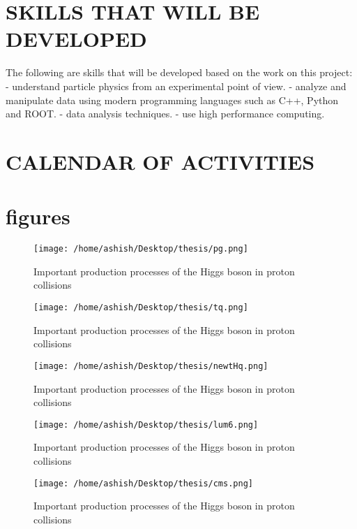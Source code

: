 \documentclass{article}
\begin{document}
\appendix
\section{SKILLS THAT WILL BE DEVELOPED}
\onehalfspacing The following are skills that will be developed based on the work on this project:
- understand particle physics from an experimental point of view.
- analyze and manipulate data using modern programming languages such as C++, Python and 
ROOT.
- data analysis techniques.
- use high performance computing.

\section{CALENDAR OF ACTIVITIES}







\section{figures}

\begin{figure}
  \centering
   \texttt{[image: /home/ashish/Desktop/thesis/pg.png]}
  \caption{Important production processes of the Higgs boson in proton collisions}
   \label{figure 1}
\end{figure}

\begin{figure}
  \centering
   \texttt{[image: /home/ashish/Desktop/thesis/tq.png]}
  \caption{Important production processes of the Higgs boson in proton collisions}
   \label{figure 2}
\end{figure}



\begin{figure}
  \centering
   \texttt{[image: /home/ashish/Desktop/thesis/newtHq.png]}
  \caption{Important production processes of the Higgs boson in proton collisions}
   \label{figure 4}
\end{figure}

\begin{figure}
  \centering
   \texttt{[image: /home/ashish/Desktop/thesis/lum6.png]}
  \caption{Important production processes of the Higgs boson in proton collisions}
   \label{figure 5}
\end{figure}

\begin{figure}
  \centering
   \texttt{[image: /home/ashish/Desktop/thesis/cms.png]}
  \caption{Important production processes of the Higgs boson in proton collisions}
   \label{figure 6}
\end{figure}
\end{document}
